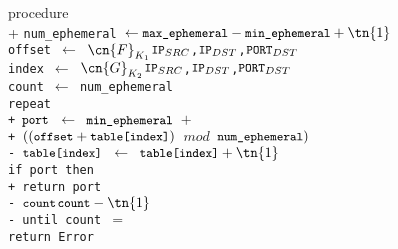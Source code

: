 
\begin{algorithm}{}{\thetcbcounter}\label{alg:dhps_port_selection}
	\begin{pseudo}[indent-mark,kw,hl-warn=false]
		procedure  \\+
		\tt{num\_ephemeral} $\leftarrow \tt{max\_ephemeral} - \tt{min\_ephemeral}+\tn{1}$ \\
    \tt{offset} $\leftarrow$ $\cn{F}_{K_1}$\tn{(}$\tt{IP}_{SRC}$,$\tt{IP}_{DST}$,$\tt{PORT}_{DST}$\tn{)} \\
    \tt{index} $\leftarrow$ $\cn{G}_{K_2}$\tn{(}$\tt{IP}_{SRC}$,$\tt{IP}_{DST}$,$\tt{PORT}_{DST}$\tn{)} \\
		\tt{count} $\leftarrow$ \tt{num\_ephemeral} \\
		repeat \\+
		$\tt{port}$ $\leftarrow$ $\tt{min\_ephemeral}$ $+$\\+
		$((\tt{offset}+\tt{table[index]})$ $mod$ $\tt{num\_ephemeral})$ \\-
		$\tt{table[index]}$ $\leftarrow$ $\tt{table[index]} +\tn{1}$ \\
		if \tn{(}\tt{port}\tn{)} then \\+
		return \tt{port} \\-
		$\tt{count} $\leftarrow$ \tt{count} - \tn{1}$ \\-
		until \tt{count} $=$  \\
		return \tt{Error}\\
	\end{pseudo}
\end{algorithm}
